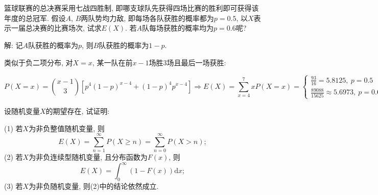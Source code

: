 \documentclass[standard]{ExBook}
\begin{document}

\section{}

\begin{qitems}
    \begin{bbox}
    \begin{shaded}
        \qitem 
篮球联赛的总决赛采用七战四胜制, 即哪支球队先获得四场比赛的胜利即可获得该年度的总冠军. 假设$A$, $B$两队势均力敌, 即每场各队获胜的概率都为$p = 0.5$, 以$X$表示一届总决赛的比赛场次, 试求$E(X)$. 若$A$队每场获胜的概率均为$p = 0.6$呢?
    \end{shaded}
    \end{bbox}

\vspace{-5em}

    \begin{bbox}
解: 记$A$队获胜的概率为$p$, 则$B$队获胜的概率为$1-p$.

类似于负二项分布, 对$X=x$, 某一队在前$x-1$场胜3场且最后一场获胜:
\vspace{-2em}
\begin{center}
\begin{equation}
    P(X=x)=\binom{x-1}{3}\left[p^{4}(1-p)^{x-4}+(1-p)^{4}p^{x-4}\right]
    \Longrightarrow
    E(X)=
    \sum\limits_{x=4}^{7}xP(X=x)
    =
    \left\{
\begin{array}{l}
    \nonumber
    \frac{93}{16}=5.8125,\ p=0.5\\
    \frac{89088}{15625}\approx5.6973,\ p=0.6
\end{array}
    \right.
\end{equation}
\end{center}
    \end{bbox}

\vspace{-5em}

    \begin{bbox}
    \begin{shaded}
        \qitem
设随机变量$X$的期望存在, 试证明:

(1) 若$X$为非负整值随机变量, 则
$$E(X)=\sum\limits_{n=1}^{\infty}P(X\geq n)=\sum\limits_{n=0}^{\infty}P(X>n);$$
(2) 若$ X $为非负连续型随机变量, 且分布函数为$F(x)$, 则
$$E(X)=\int_{0}^{\infty}(1-F(x))\mathrm{d}x;$$
(3) 若$ X $为非负随机变量, 则(2)中的结论依然成立.
    \end{shaded}
    \end{bbox}


\end{qitems}
\end{document}
